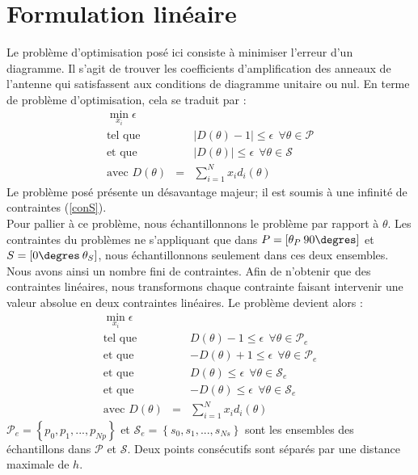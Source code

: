 \section{Formulation linéaire}Le problème d'optimisation posé ici consiste à minimiser l'erreur d'un diagramme. Il s'agit de trouver les coefficients d'amplification des anneaux de l'antenne qui satisfassent aux conditions de diagramme unitaire ou nul. En terme de problème d'optimisation, cela se traduit par :
\begin{eqnarray}
\min_{x_i} \epsilon & & \nonumber\\
\text{tel que} & & |D(\theta)-1|\leq \epsilon \:\: \forall \theta\in \mathcal{P}\nonumber\\
\text{et que} & & |D(\theta)|\leq \epsilon \:\: \forall \theta\in \mathcal{S}\label{conS}\\
\text{avec } D(\theta) &=& \sum_{i=1}^N x_i d_i(\theta) \nonumber
\end{eqnarray}
Le problème posé présente un désavantage majeur; il est soumis à une infinité de contraintes (\ref{conS}).\\
Pour pallier à ce problème, nous échantillonnons le problème par rapport à $\theta$. Les contraintes du problèmes ne s'appliquant que dans $P = [\theta_P\: 90\degres  ]$ et $S = [0\degres \:\theta_S]$, nous échantillonnons seulement dans ces deux ensembles. Nous avons ainsi un nombre fini de contraintes. Afin de n'obtenir que des contraintes linéaires, nous transformons chaque contrainte faisant intervenir une valeur absolue en deux contraintes linéaires. Le problème devient alors : 
\begin{eqnarray}
\min_{x_i} \epsilon & & \nonumber\\
\text{tel que} & & D(\theta)-1\leq \epsilon \:\: \forall \theta\in \mathcal{P}_e\nonumber\\
\text{et que} & & -D(\theta)+1\leq \epsilon \:\: \forall \theta\in \mathcal{P}_e\nonumber\\
\text{et que} & & D(\theta)\leq \epsilon \:\: \forall \theta\in \mathcal{S}_e\nonumber\\
\text{et que} & & -D(\theta)\leq \epsilon \:\: \forall \theta\in \mathcal{S}_e\nonumber\\
\text{avec } D(\theta) &=& \sum_{i=1}^N x_i d_i(\theta) \nonumber
\end{eqnarray}
$\mathcal{P}_e = \left\lbrace p_0,p_1,...,p_{Np}\right\rbrace$ et $\mathcal{S}_e= \left\lbrace s_0,s_1,...,s_{Ns}\right\rbrace$ sont les ensembles des échantillons dans $\mathcal{P}$ et $\mathcal{S}$. Deux points consécutifs sont séparés par une distance maximale de $h$.\\
